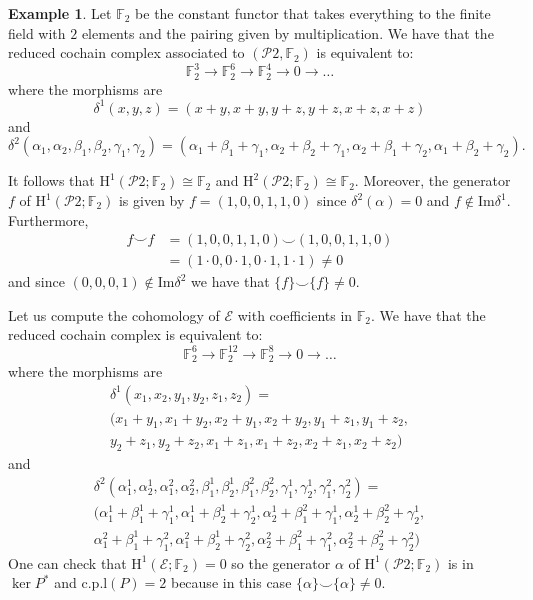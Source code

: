 \documentclass[12pt,reqno]{amsart}
\theoremstyle{definition}
\newtheorem{example}[teo]{Example}
\theoremstyle{remark}
\numberwithin{figure}{section}%
\newcommand{\Ho}{\mathrm{H}}
\newcommand{\Ima}{\mathrm{Im}}
\begin{document}
\begin{example}
    Let $\mathbb{F}_2$ be the constant functor that takes everything to the finite field with $2$ elements and the pairing given by multiplication. We have that the reduced cochain complex associated to $(\mathcal{P}2,\mathbb{F}_2)$ is equivalent to: $$\mathbb{F}_2^3\rightarrow\mathbb{F}_2^6\rightarrow\mathbb{F}_2^4\rightarrow0\rightarrow\dots$$ where the morphisms are $$\delta^1(x,y,z)=(x+y,x+y,y+z,y+z,x+z,x+z)$$ and $$\delta^2(\alpha_1,\alpha_2,\beta_1,\beta_2,\gamma_1,\gamma_2)=(\alpha_1+\beta_1+\gamma_1,\alpha_2+\beta_2+\gamma_1,\alpha_2+\beta_1+\gamma_2,\alpha_1+\beta_2+\gamma_2).$$
    
    
   It follows that $\Ho^1(\mathcal{P}2;\mathbb{F}_2)\cong \mathbb{F}_2$ and $\Ho^2(\mathcal{P}2;\mathbb{F}_2)\cong \mathbb{F}_2$. Moreover, the generator $f$ of $\Ho^1(\mathcal{P}2;\mathbb{F}_2)$ is given by $f=(1,0,0,1,1,0)$ since $\delta^2(\alpha)=0$ and  $f\notin \Ima \delta^1$. Furthermore, 
   \begin{align*}
        f\smile f&=(1,0,0,1,1,0)\smile(1,0,0,1,1,0)\\&=(1\cdot0,0\cdot1,0\cdot1,1\cdot1)\neq0
    \end{align*}
    and since $(0,0,0,1) \notin \Ima \delta^2$ we have that $\{f\} \smile \{f\}\neq 0.$
    
    
    Let us compute the cohomology of $\mathcal{E}$ with coefficients in $\mathbb{F}_2$. We have that the reduced cochain complex is equivalent to: $$\mathbb{F}_2^6\rightarrow\mathbb{F}_2^{12}\rightarrow\mathbb{F}_2^8\rightarrow0\rightarrow\dots$$ where the morphisms are \begin{align*}
    \delta^1(x_1,x_2,y_1,y_2,z_1,z_2)=\\(x_1+y_1,x_1+y_2,x_2+y_1,x_2+y_2,y_1+z_1,y_1+z_2,\\y_2+z_1,y_2+z_2,x_1+z_1,x_1+z_2,x_2+z_1,x_2+z_2)
    \end{align*} and \begin{align*}\delta^2(\alpha_1^1,\alpha_2^1,\alpha^2_1,\alpha^2_2,\beta_1^1,\beta^1_2,\beta_1^2,\beta_2^2,\gamma_1^1,\gamma_2^1,\gamma_1^2,\gamma_2^2)=\\(\alpha_1^1+\beta_1^1+\gamma_1^1,\alpha_1^1+\beta_2^1+\gamma^1_2,\alpha_2^1+\beta_1^2+\gamma^1_1,\alpha_2^1+\beta_2^2+\gamma^1_2,\\
    \alpha_1^2+\beta_1^1+\gamma^2_1,\alpha_1^2+\beta_2^1+\gamma^2_2,\alpha_2^2+\beta_1^2+\gamma^2_1,\alpha_2^2+\beta_2^2+\gamma^2_2)
    \end{align*}
One can check that $\Ho^1(\mathcal{E};\mathbb{F}_2)=0$ so the generator $\alpha$ of $\Ho^1(\mathcal{P}2;\mathbb{F}_2)$ is in $\ker P^*$ and $\mathrm{c.p.l}(P)=2$ because in this case $\{\alpha\} \smile \{\alpha\} \neq 0.$ 
    

\end{example}
\end{document}
